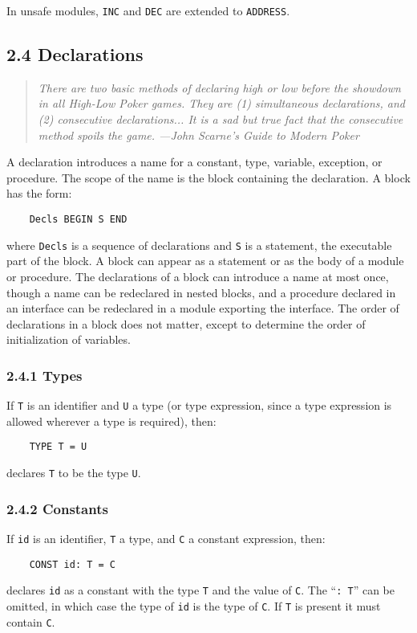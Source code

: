 \documentclass[10pt]{article}
\begin{document}
In unsafe modules, \verb|INC| and \verb|DEC| are extended to \verb|ADDRESS|.

\subsection*{2.4 Declarations}

\begin{quote}
  \emph{There are two basic methods of declaring high or low before the
    showdown in all High-Low Poker games.  They are (1) simultaneous
    declarations, and (2) consecutive declarations... It is a sad but true
    fact that the consecutive method spoils the game.  ---John Scarne's Guide
    to Modern Poker}
\end{quote}

A declaration introduces a name for a constant, type, variable, exception, or
procedure.  The scope of the name is the block containing the declaration.  A
block has the form:
\begin{verbatim}
    Decls BEGIN S END
\end{verbatim}
where \verb|Decls| is a sequence of declarations and \verb|S| is a statement,
the executable part of the block.  A block can appear as a statement or as the
body of a module or procedure.  The declarations of a block can introduce a
name at most once, though a name can be redeclared in nested blocks, and a
procedure declared in an interface can be redeclared in a module exporting the
interface.  The order of declarations in a block does not matter, except to
determine the order of initialization of variables.

\subsubsection*{2.4.1 Types}

If \verb|T| is an identifier and \verb|U| a type (or type expression, since a
type expression is allowed wherever a type is required), then:
\begin{verbatim}
    TYPE T = U
\end{verbatim}
declares \verb|T| to be the type \verb|U|.

\subsubsection*{2.4.2 Constants}

If \verb|id| is an identifier, \verb|T| a type, and \verb|C| a constant
expression, then:
\begin{verbatim}
    CONST id: T = C
\end{verbatim}
declares \verb|id| as a constant with the type \verb|T| and the value of
\verb|C|.  The ``\verb|: T|'' can be omitted, in which case the type of
\verb|id| is the type of \verb|C|.  If \verb|T| is present it must contain
\verb|C|.
\end{document}
